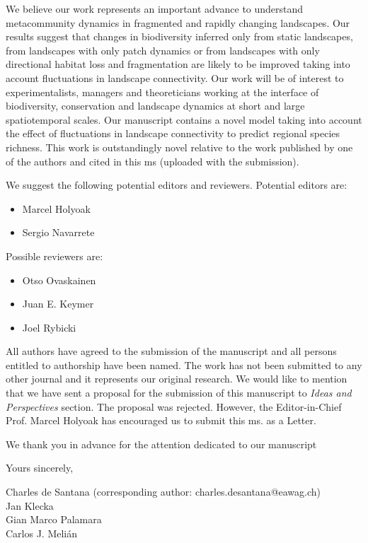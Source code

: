 \documentclass{article}
\begin{document}
We believe our work represents an important advance to understand metacommunity dynamics in fragmented and rapidly changing landscapes. Our results suggest that changes in biodiversity inferred only from static landscapes, from landscapes with only patch dynamics or from landscapes with only directional habitat loss and fragmentation are likely to be improved taking into account fluctuations in landscape connectivity. Our work will be of interest to experimentalists, managers and theoreticians working at the interface of biodiversity, conservation and landscape dynamics at short and large spatiotemporal scales. Our manuscript contains a novel model taking into account the effect of fluctuations in landscape connectivity to predict regional species richness. This work is outstandingly novel relative to the work published by one of the authors and cited in this ms (uploaded with the submission). 

We suggest the following potential editors and reviewers.
Potential editors are:

\begin{itemize}
\item Marcel Holyoak
\item Sergio Navarrete
\end{itemize}

Possible reviewers are:

\begin{itemize}
\item Otso Ovaskainen
\item Juan E. Keymer
\item Joel Rybicki
\end{itemize}

All authors have agreed to the submission of the manuscript and all persons entitled to authorship have been named. The work has not been submitted to any other journal and it represents our original research. We would like to mention that we have sent a proposal for the submission of this manuscript to \emph{Ideas and Perspectives} section. The proposal was rejected. However, the Editor-in-Chief Prof. Marcel Holyoak has encouraged us to submit this ms. as a Letter.

We thank you in advance for the attention dedicated to our manuscript

Yours sincerely,
\vspace{0.1 in}

\noindent Charles de Santana (corresponding author: charles.desantana@eawag.ch)\\
Jan Klecka\\
Gian Marco Palamara\\
Carlos J. Meli\'an\\
\end{document}
